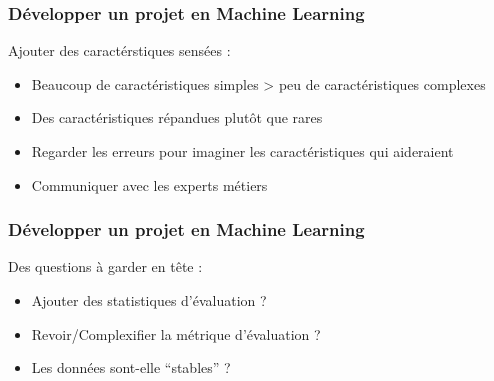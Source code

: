 \documentclass{formation}
\begin{document}
\begin{frame}
  \frametitle{Développer un projet en Machine Learning}
  Ajouter des caractérstiques sensées :
  \begin{itemize}
  \item Beaucoup de caractéristiques simples > peu de caractéristiques complexes
  \item Des caractéristiques répandues plutôt que rares
  \item Regarder les erreurs pour imaginer les caractéristiques qui aideraient
  \item Communiquer avec les experts métiers
  \end{itemize}
\end{frame}

\begin{frame}
  \frametitle{Développer un projet en Machine Learning}
  Des questions à garder en tête :
  \begin{itemize}
  \item Ajouter des statistiques d'évaluation ?
  \item Revoir/Complexifier la métrique d'évaluation ?
  \item Les données sont-elle ``stables'' ?
  \end{itemize}
\end{frame}
\end{document}
